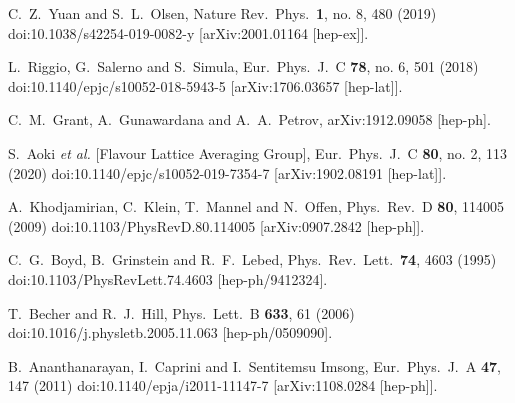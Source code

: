 \begin{thebibliography}{99}
  C.~Z.~Yuan and S.~L.~Olsen,
  Nature Rev.\ Phys.\  {\bf 1}, no. 8, 480 (2019)
  doi:10.1038/s42254-019-0082-y
  [arXiv:2001.01164 [hep-ex]].
  
  L.~Riggio, G.~Salerno and S.~Simula,
  Eur.\ Phys.\ J.\ C {\bf 78}, no. 6, 501 (2018)
  doi:10.1140/epjc/s10052-018-5943-5
  [arXiv:1706.03657 [hep-lat]].
  
  C.~M.~Grant, A.~Gunawardana and A.~A.~Petrov,
  arXiv:1912.09058 [hep-ph].  
  
  S.~Aoki {\it et al.} [Flavour Lattice Averaging Group],
  Eur.\ Phys.\ J.\ C {\bf 80}, no. 2, 113 (2020)
  doi:10.1140/epjc/s10052-019-7354-7
  [arXiv:1902.08191 [hep-lat]].
  
  A.~Khodjamirian, C.~Klein, T.~Mannel and N.~Offen,
  Phys.\ Rev.\ D {\bf 80}, 114005 (2009)
  doi:10.1103/PhysRevD.80.114005
  [arXiv:0907.2842 [hep-ph]].
  
  C.~G.~Boyd, B.~Grinstein and R.~F.~Lebed,
  Phys.\ Rev.\ Lett.\  {\bf 74}, 4603 (1995)
  doi:10.1103/PhysRevLett.74.4603
  [hep-ph/9412324].
  
  T.~Becher and R.~J.~Hill,
  Phys.\ Lett.\ B {\bf 633}, 61 (2006)
  doi:10.1016/j.physletb.2005.11.063
  [hep-ph/0509090].
  
  B.~Ananthanarayan, I.~Caprini and I.~Sentitemsu Imsong,
  Eur.\ Phys.\ J.\ A {\bf 47}, 147 (2011)
  doi:10.1140/epja/i2011-11147-7
  [arXiv:1108.0284 [hep-ph]].
  

\end{thebibliography}
